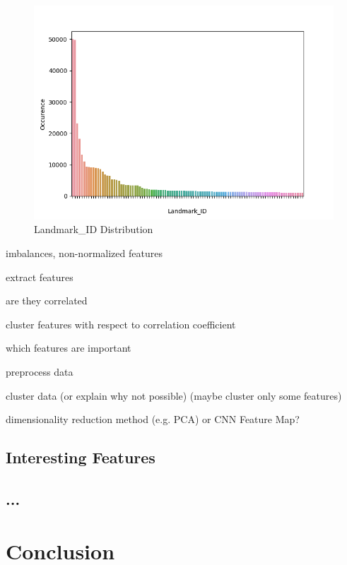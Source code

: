 \begin{figure}
	\includegraphics[width=\textwidth]{images/distribution}
	\caption{Landmark\_ID Distribution}
	\label{distribution}
\end{figure}

imbalances, non-normalized features

extract features

are they correlated

cluster features with respect to correlation coefficient

which features are important

preprocess data

cluster data (or explain why not possible) (maybe cluster only some features)

dimensionality reduction method (e.g. PCA) or CNN Feature Map?

\section*{Interesting Features}
\section*{...}

\chapter{Conclusion}